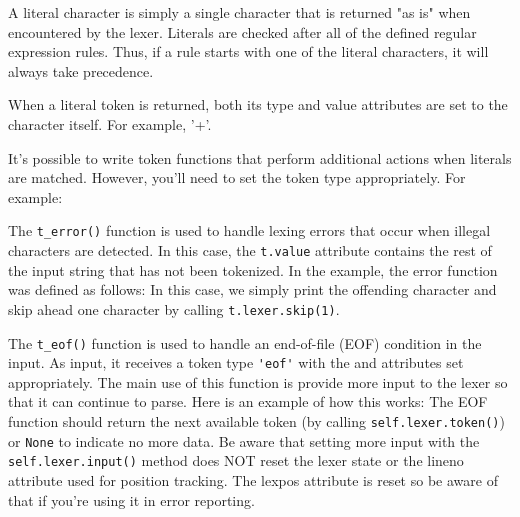 A literal character is simply a single character that is returned "as is" when
encountered by the lexer. Literals are checked after all of the defined regular
expression rules. Thus, if a rule starts with one of the literal characters, it
will always take precedence.

When a literal token is returned, both its type and value attributes are set to
the character itself. For example, '+'.

It's possible to write token functions that perform additional actions when
literals are matched. However, you'll need to set the token type appropriately.
For example:


The \verb|t_error()| function is used to handle lexing errors that occur when
illegal characters are detected. In this case, the \verb|t.value| attribute
contains the rest of the input string that has not been tokenized. In the
example, the error function was defined as follows:
In this case, we simply print the offending character and skip ahead one
character by calling \verb|t.lexer.skip(1)|.


The \verb|t_eof()| function is used to handle an end-of-file (EOF) condition in
the input. As input, it receives a token type \verb|'eof'| with the 
and  attributes set appropriately. The main use of this function is
provide more input to the lexer so that it can continue to parse.
Here is an example of how this works:
The EOF function should return the next available token (by calling
\verb|self.lexer.token()|) or \verb|None| to indicate no more data. Be aware
that setting more input with the \verb|self.lexer.input()| method does NOT reset
the lexer state or the lineno attribute used for position tracking. The lexpos
attribute is reset so be aware of that if you're using it in error reporting.

\secup

